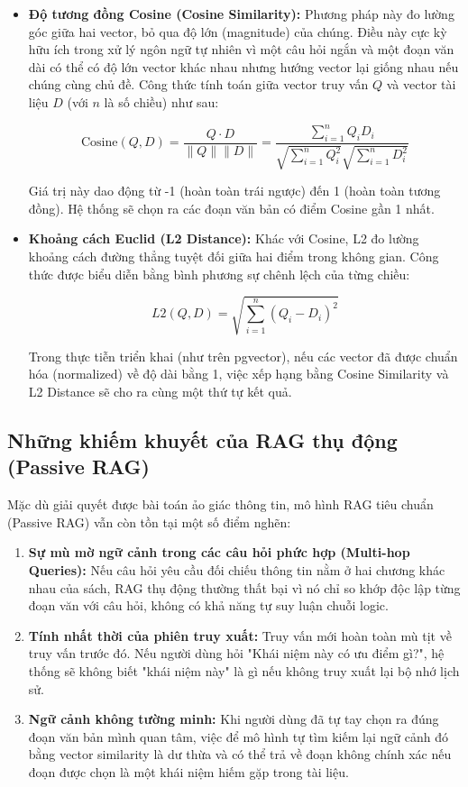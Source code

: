 \begin{itemize}
    \item \textbf{Độ tương đồng Cosine (Cosine Similarity):} Phương pháp này đo lường góc giữa hai vector, bỏ qua độ lớn (magnitude) của chúng. Điều này cực kỳ hữu ích trong xử lý ngôn ngữ tự nhiên vì một câu hỏi ngắn và một đoạn văn dài có thể có độ lớn vector khác nhau nhưng hướng vector lại giống nhau nếu chúng cùng chủ đề. Công thức tính toán giữa vector truy vấn $Q$ và vector tài liệu $D$ (với $n$ là số chiều) như sau:

$$ \text{Cosine}(Q, D) = \frac{Q \cdot D}{\|Q\| \|D\|} = \frac{\sum_{i=1}^{n} Q_i D_i}{\sqrt{\sum_{i=1}^{n} Q_i^2} \sqrt{\sum_{i=1}^{n} D_i^2}} $$

Giá trị này dao động từ -1 (hoàn toàn trái ngược) đến 1 (hoàn toàn tương đồng). Hệ thống sẽ chọn ra các đoạn văn bản có điểm Cosine gần 1 nhất.

    \item \textbf{Khoảng cách Euclid (L2 Distance):} Khác với Cosine, L2 đo lường khoảng cách đường thẳng tuyệt đối giữa hai điểm trong không gian. Công thức được biểu diễn bằng bình phương sự chênh lệch của từng chiều:

$$ L2(Q, D) = \sqrt{\sum_{i=1}^{n} (Q_i - D_i)^2} $$

Trong thực tiễn triển khai (như trên pgvector), nếu các vector đã được chuẩn hóa (normalized) về độ dài bằng 1, việc xếp hạng bằng Cosine Similarity và L2 Distance sẽ cho ra cùng một thứ tự kết quả.
\end{itemize}

\subsection{Những khiếm khuyết của RAG thụ động (Passive RAG)}
Mặc dù giải quyết được bài toán ảo giác thông tin, mô hình RAG tiêu chuẩn (Passive RAG) vẫn còn tồn tại một số điểm nghẽn:

\begin{enumerate}
    \item \textbf{Sự mù mờ ngữ cảnh trong các câu hỏi phức hợp (Multi-hop Queries):} Nếu câu hỏi yêu cầu đối chiếu thông tin nằm ở hai chương khác nhau của sách, RAG thụ động thường thất bại vì nó chỉ so khớp độc lập từng đoạn văn với câu hỏi, không có khả năng tự suy luận chuỗi logic.
    \item \textbf{Tính nhất thời của phiên truy xuất:} Truy vấn mới hoàn toàn mù tịt về truy vấn trước đó. Nếu người dùng hỏi "Khái niệm này có ưu điểm gì?", hệ thống sẽ không biết "khái niệm này" là gì nếu không truy xuất lại bộ nhớ lịch sử.
    \item \textbf{Ngữ cảnh không tường minh:} Khi người dùng đã tự tay chọn ra đúng đoạn văn bản mình quan tâm, việc để mô hình tự tìm kiếm lại ngữ cảnh đó bằng vector similarity là dư thừa và có thể trả về đoạn không chính xác nếu đoạn được chọn là một khái niệm hiếm gặp trong tài liệu.
\end{enumerate}


